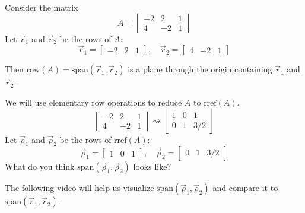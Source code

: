 \documentclass{ximera}
\begin{document}
\begin{exploration}\label{init:rowspace}
Consider the matrix
$$A=\begin{bmatrix}-2&2&1\\4&-2&1\end{bmatrix}$$
Let $\vec{r}_1$ and $\vec{r}_2$ be the rows of $A$: 
$$\vec{r}_1=\begin{bmatrix}-2&2&1\end{bmatrix},\quad \vec{r}_2=\begin{bmatrix}4&-2&1\end{bmatrix}$$

Then 
$\mbox{row}(A)=\mbox{span}(\vec{r}_1, \vec{r}_2)$
is a plane through the origin containing $\vec{r}_1$ and  $\vec{r}_2$.  

\begin{center}
\end{center}

We will use elementary row operations to reduce $A$ to $\mbox{rref}(A)$.
$$\begin{bmatrix}-2&2&1\\4&-2&1\end{bmatrix}\rightsquigarrow\begin{bmatrix}1&0&1\\0&1&3/2\end{bmatrix}$$
Let $\vec{\rho}_1$ and $\vec{\rho}_2$ be the rows of $\mbox{rref}(A)$:
$$\vec{\rho}_1=\begin{bmatrix}1&0&1\end{bmatrix},\quad \vec{\rho}_2=\begin{bmatrix}0&1&3/2\end{bmatrix}$$
What do you think $\mbox{span}(\vec{\rho}_1, \vec{\rho}_2)$ looks like?  

The following video will help us visualize $\mbox{span}(\vec{\rho}_1, \vec{\rho}_2)$ and compare it to $\mbox{span}(\vec{r}_1, \vec{r}_2)$.


\end{exploration}
\end{document}
